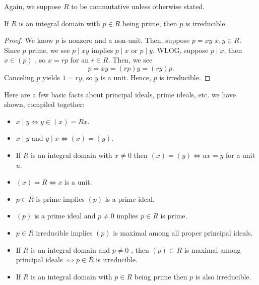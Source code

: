 Again, we suppose \(R\) to be commutative unless otherwise stated.
\begin{proposition}
	If \(R\) is an integral domain with \(p \in R\) being prime, then \(p\) is irreducible.
\end{proposition}
\begin{proof}
	We know \(p\) is nonzero and a non-unit. Then, suppose \(p = xy\)  \(x, y \in R\). Since \(p\) prime, we see \(p \mid xy\) implies \(p \mid x\) or \(p \mid y\). WLOG, suppose \(p \mid x\), then \(x \in\left( p \right) \) , so \(x = rp\) for an \(r \in R\). Then, we see \[
		p = xy = \left( rp \right) y = \left( ry \right) p
	.\]
	Canceling \(p\) yields \(1 = ry\), so \(y\) is a unit. Hence, \(p\) is irreducible.
\end{proof}
\begin{remark}
	Here are a few basic facts about principal ideals, prime ideals, etc. we have shown, compiled together:
	\begin{itemize}
		\item \(x \mid y \iff y \in \left( x \right) = Rx\).
		\item \(x \mid y\) and \(y \mid x \iff \left( x \right)  = \left( y \right) \).
		\item  If \(R\) is an integral domain with \(x \neq 0\) then \(\left( x \right)  = \left( y \right) \iff ux = y\) for a unit \(u\).
		\item \(\left( x \right)  = R \iff x\) is a unit.
		\item \(p \in R\) is prime implies \(\left( p \right)\)  is a prime ideal.
		\item \(\left( p \right) \) is a prime ideal and \(p \neq 0\) implies \(p \in R\) is prime.
		\item \(p \in R\) irreducible implies \(\left( p \right) \)  is maximal among all proper principal ideals.
		\item If \(R\) is an integral domain and \(p \neq 0\) , then \(\left( p \right) \subset R\) is maximal among principal ideals \(\iff p \in R\) is irreducible.
		\item If \(R\) is an integral domain with \(p \in R\) being prime then \(p\) is also irreducible.
	\end{itemize}
\end{remark}
